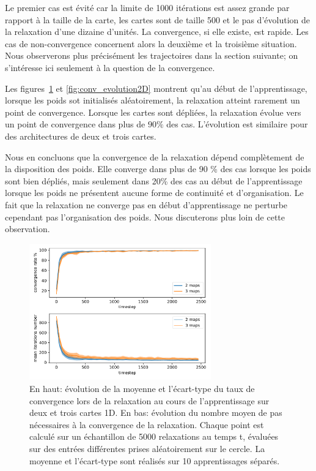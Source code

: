 \documentclass[../main]{subfiles}
\begin{document}
Le premier cas est évité car la limite de 1000 itérations est assez grande par rapport à la taille de la carte, les cartes sont de taille 500 et le pas d'évolution de la relaxation d'une dizaine d'unités. 
La convergence, si elle existe, est rapide. Les cas de non-convergence concernent alors la deuxième et la troisième situation. Nous observerons plus précisément les trajectoires dans la section suivante; on s'intéresse ici seulement à la question de la convergence.

Les figures~\ref{fig:conv_evolution} et \ref{fig:conv_evolution2D} montrent qu'au début de l'apprentissage, lorsque les poids sot initialisés aléatoirement, la relaxation atteint rarement un point de convergence. Lorsque les cartes sont dépliées, la relaxation évolue vers un point de convergence dans plus de $90 \%$ des cas. L'évolution est similaire pour des architectures de deux et trois cartes.

Nous en  concluons que la convergence de la relaxation dépend complètement de la disposition des poids. 
Elle converge dans plus de 90 \% des cas lorsque les poids sont bien dépliés, mais seulement dans 20\% des cas au début de l'apprentissage lorsque les poids ne présentent aucune forme de continuité et d'organisation.
Le fait que la relaxation ne converge pas en début d'apprentissage ne perturbe cependant pas l'organisation des poids.
Nous discuterons plus loin de cette observation.

\begin{figure}
\centering
\includegraphics[width=0.7\textwidth]{1D_conv_evolution_total.pdf}
\caption{En haut: évolution de la moyenne et l'écart-type du taux de convergence lors de la relaxation au cours de l'apprentissage sur deux et trois cartes 1D. En bas: évolution du nombre moyen de pas nécessaires à la convergence de la relaxation.
Chaque point est calculé sur un échantillon de 5000 relaxations au temps t, évaluées sur des entrées différentes prises aléatoirement sur le cercle. La moyenne et l'écart-type sont réalisés sur 10 apprentissages séparés.}
\label{fig:conv_evolution}
\end{figure}
\end{document}
